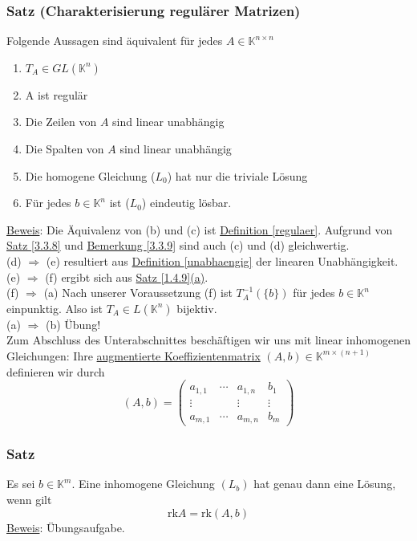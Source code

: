 \subsubsection{Satz (Charakterisierung regulärer Matrizen)}
Folgende Aussagen sind äquivalent für jedes $A\in\mathbb{K}^{n\times n}$
\begin{enumerate}
\item $T_A\in GL(\mathbb{K}^n)$
\item A ist regulär
\item Die Zeilen von $A$ sind linear unabhängig
\item Die Spalten von $A$ sind linear unabhängig
\item Die homogene Gleichung ($L_0$) hat nur die triviale Lösung
\item Für jedes $b\in\mathbb{K}^n$ ist ($L_0$) eindeutig lösbar.
\end{enumerate}
\underline{Beweis}: Die Äquivalenz von (b) und (c) ist \hyperref[regulaer]{Definition \ref*{regulaer}}.  Aufgrund von \hyperref[3.3.8]{Satz \ref*{3.3.8}} und \hyperref[3.3.9]{Bemerkung \ref*{3.3.9}} sind auch (c) und (d) gleichwertig.\\
(d) $\Rightarrow$ (e) resultiert aus \hyperref[unabhaengig]{Definition \ref*{unabhaengig}} der linearen Unabhängigkeit.\\
(e) $\Rightarrow$ (f) ergibt sich aus \hyperref[1.4.9]{Satz \ref*{1.4.9}(a)}.\\
(f) $\Rightarrow$ (a) Nach unserer Voraussetzung (f) ist $T_A^{-1}(\{b\})$ für jedes $b\in \mathbb{K}^n$ einpunktig.  Also ist $T_A\in L(\mathbb{K}^n)$ bijektiv.\\
(a) $\Rightarrow$ (b) Übung!\\
Zum Abschluss des Unterabschnittes beschäftigen wir uns mit linear inhomogenen Gleichungen: Ihre \underline{augmentierte Koeffizientenmatrix} $(A,b)\in\mathbb{K}^{m\times (n+1)}$ definieren wir durch
\[(A,b)=\begin{pmatrix}a_{1,1}& \cdots &a_{1,n} & b_1\\ \vdots & & \vdots & \vdots\\ a_{m,1}&\cdots &a_{m,n}&b_m\end{pmatrix}\]
\subsubsection{Satz}
Es sei $b\in\mathbb{K}^m$.  Eine inhomogene Gleichung $(L_b)$ hat genau dann eine Lösung, wenn gilt
\[\mathrm{rk}A=\mathrm{rk}(A,b)\]
\underline{Beweis}: Übungsaufgabe.
\addtocounter{subsubsection}{-13}
